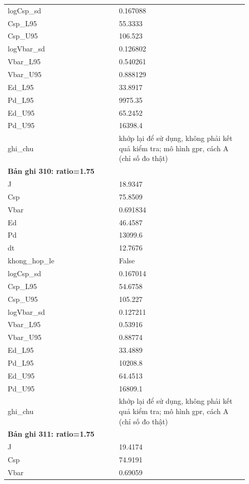 \begin{longtable}{p{0.43\linewidth}p{0.50\linewidth}}
logCsp\_\allowbreak sd & 0.167088 \\
Csp\_\allowbreak L95 & 55.3333 \\
Csp\_\allowbreak U95 & 106.523 \\
logVbar\_\allowbreak sd & 0.126802 \\
Vbar\_\allowbreak L95 & 0.540261 \\
Vbar\_\allowbreak U95 & 0.888129 \\
Ed\_\allowbreak L95 & 33.8917 \\
Pd\_\allowbreak L95 & 9975.35 \\
Ed\_\allowbreak U95 & 65.2452 \\
Pd\_\allowbreak U95 & 16398.4 \\
ghi\_\allowbreak chu & khớp lại để sử dụng, không phải kết quả kiểm tra; mô hình gpr, cách A (chỉ số đo thật) \\
\midrule
\multicolumn{2}{p{0.95\linewidth}}{\textbf{Bản ghi 310: ratio=1.75}} \\
J & 18.9347 \\
Csp & 75.8509 \\
Vbar & 0.691834 \\
Ed & 46.4587 \\
Pd & 13099.6 \\
dt & 12.7676 \\
khong\_\allowbreak hop\_\allowbreak le & False \\
logCsp\_\allowbreak sd & 0.167014 \\
Csp\_\allowbreak L95 & 54.6758 \\
Csp\_\allowbreak U95 & 105.227 \\
logVbar\_\allowbreak sd & 0.127211 \\
Vbar\_\allowbreak L95 & 0.53916 \\
Vbar\_\allowbreak U95 & 0.88774 \\
Ed\_\allowbreak L95 & 33.4889 \\
Pd\_\allowbreak L95 & 10208.8 \\
Ed\_\allowbreak U95 & 64.4513 \\
Pd\_\allowbreak U95 & 16809.1 \\
ghi\_\allowbreak chu & khớp lại để sử dụng, không phải kết quả kiểm tra; mô hình gpr, cách A (chỉ số đo thật) \\
\midrule
\multicolumn{2}{p{0.95\linewidth}}{\textbf{Bản ghi 311: ratio=1.75}} \\
J & 19.4174 \\
Csp & 74.9191 \\
Vbar & 0.69059 \\

\end{longtable}
